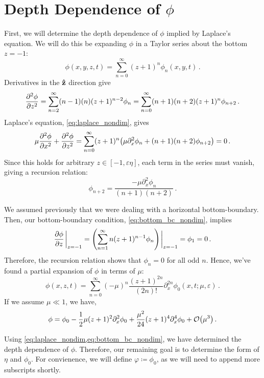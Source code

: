 \documentclass{jfm}
\renewcommand*{\epsilon}{\varepsilon}
\begin{document}
\section{Depth Dependence of \texorpdfstring{$\phi$}{Velocity Potential}}
First, we will determine the depth dependence of $\phi$ implied by
Laplace's equation.
We will do this be expanding $\phi$ in a Taylor series about the bottom
$z=-1$:
\begin{equation}
  \phi(x,y,z,t) = \sum_{n=0}^\infty (z+1)^n\phi_n(x,y,t) \,.
\end{equation}
Derivatives in the $\vu{z}$ direction give
\begin{equation}
  \pdv[2]{\phi}{z} = \sum_{n=2}^{\infty} (n-1)(n)(z+1)^{n-2}\phi_n =
  \sum_{n=0}^{\infty} (n+1)(n+2)(z+1)^n\phi_{n+2} \,.
\end{equation}
Laplace's equation, \cref{eq:laplace_nondim}, gives
\begin{equation}
  \mu \pdv[2]{\phi}{x} + \pdv[2]{\phi}{z} = \sum_{n=0}^\infty
  (z+1)^n\pqty{\mu \partial^2_x \phi_n + (n+1)(n+2)\phi_{n+2}} = 0 \,.
\end{equation}
Since this holds for arbitrary $z \in [-1,\epsilon \eta]$, each
term in the series must vanish, giving a recursion relation:
\begin{equation}
  \phi_{n+2} = \frac{-\mu \partial^2_x \phi_n}{(n+1)(n+2)} \,.
\end{equation}

We assumed previously that we were dealing with a horizontal
bottom-boundary.
Then, our bottom-boundary condition, \cref{eq:bottom_bc_nondim}, implies
\begin{equation}
  \pdv{\phi}{z}\eval_{z=-1} = \pqty{\sum_{n=1}^\infty
  n(z+1)^{n-1}\phi_n}\eval_{z=-1} = \phi_1 = 0 \,.
\end{equation}
Therefore, the recursion relation shows that $\phi_n=0$ for all odd $n$.
Hence, we've found a partial expansion of $\phi$ in terms of $\mu$:
\begin{equation}
  \phi(x,z,t) = \sum_{n=0}^{\infty} (-\mu)^n \frac{(z+1)^{2n}}{(2n)!}
  \partial_x^{2n} \phi_0(x,t; \mu, \epsilon) \,.
  \label{eq:phi_expansion}
\end{equation}
If we assume $\mu \ll 1$, we have,
\begin{equation}
  \phi = \phi_0 - \frac{1}{2}\mu (z+1)^2\partial^2_x\phi_0 +
  \frac{\mu^2}{24}(z+1)^4\partial^4_x\phi_0 +
  \order{\mu^3} \,.
\end{equation}

Using \cref{eq:laplace_nondim,eq:bottom_bc_nondim}, we have determined
the depth dependence of $\phi$.
Therefore, our remaining goal is to determine the form of $\eta$ and
$\phi_0$.
For convienence, we will define $\varphi \coloneqq \phi_0$, as we will
need to append more subscripts shortly.
\end{document}

